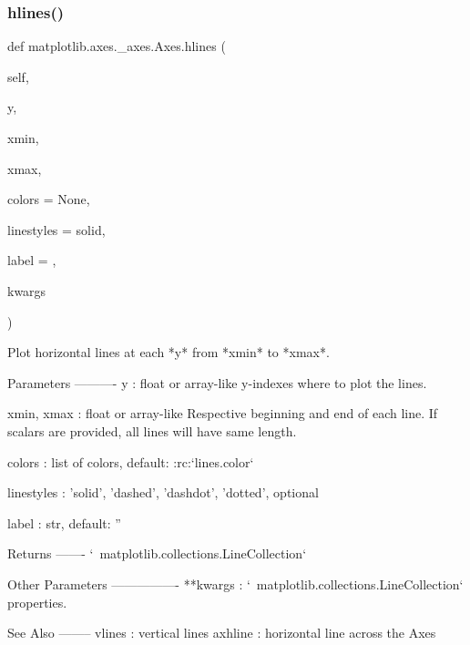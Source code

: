\begin{DoxyVerb}
\subsubsection{\texorpdfstring{hlines()}{hlines()}}
{\footnotesize\ttfamily def matplotlib.\+axes.\+\_\+axes.\+Axes.\+hlines (\begin{DoxyParamCaption}\item[{}]{self,  }\item[{}]{y,  }\item[{}]{xmin,  }\item[{}]{xmax,  }\item[{}]{colors = {\ttfamily None},  }\item[{}]{linestyles = {\ttfamily \textquotesingle{}solid\textquotesingle{}},  }\item[{}]{label = {\ttfamily \textquotesingle{}\textquotesingle{}},  }\item[{}]{kwargs }\end{DoxyParamCaption})}

\begin{DoxyVerb}Plot horizontal lines at each *y* from *xmin* to *xmax*.

Parameters
----------
y : float or array-like
    y-indexes where to plot the lines.

xmin, xmax : float or array-like
    Respective beginning and end of each line. If scalars are
    provided, all lines will have same length.

colors : list of colors, default: :rc:`lines.color`

linestyles : {'solid', 'dashed', 'dashdot', 'dotted'}, optional

label : str, default: ''

Returns
-------
`~matplotlib.collections.LineCollection`

Other Parameters
----------------
**kwargs :  `~matplotlib.collections.LineCollection` properties.

See Also
--------
vlines : vertical lines
axhline : horizontal line across the Axes
\end{DoxyVerb}
 \mbox{\label{classmatplotlib_1_1axes_1_1__axes_1_1Axes_a65e2a063891896069232333bc1bd5a2a}} 

\end{DoxyVerb}
